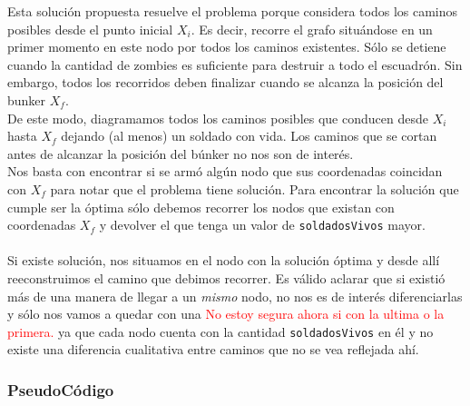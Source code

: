 \bigskip


Esta soluci\'on propuesta resuelve el problema porque considera todos los caminos posibles desde el punto inicial $X_i$. Es decir, recorre el grafo situ\'andose en un primer momento en este nodo por todos los caminos existentes. S\'olo se detiene cuando la cantidad de zombies es suficiente para destruir a todo el escuadr\'on. Sin embargo, todos los recorridos deben finalizar cuando se alcanza la posici\'on del bunker $X_f$.\\

De este modo, diagramamos todos los caminos posibles que conducen desde $X_i$ hasta $X_f$ dejando (al menos) un soldado con vida. Los caminos que se cortan antes de alcanzar la posici\'on del b\'unker no nos son de inter\'es.\\

Nos basta con encontrar si se arm\'o alg\'un nodo que sus coordenadas coincidan con $X_f$ para notar que el problema tiene soluci\'on. Para encontrar la soluci\'on que cumple ser la \'optima s\'olo debemos recorrer los nodos que existan con coordenadas $X_f$ y devolver el que tenga un valor de \texttt{soldadosVivos} mayor.\\
\\

Si existe soluci\'on, nos situamos en el nodo con la soluci\'on \'optima y desde all\'i reeconstruimos el camino que debimos recorrer. Es v\'alido aclarar que si existi\'o m\'as de una manera de llegar a un \emph{mismo} nodo, no nos es de inter\'es diferenciarlas y s\'olo  nos vamos a quedar con una \textcolor{red}{No estoy segura ahora si con la ultima o la primera.} ya que cada nodo cuenta con la cantidad \texttt{soldadosVivos} en \'el y no existe una diferencia cualitativa entre caminos que no se vea reflejada ah\'i.\\

\bigskip





\subsubsection*{PseudoC\'odigo}

